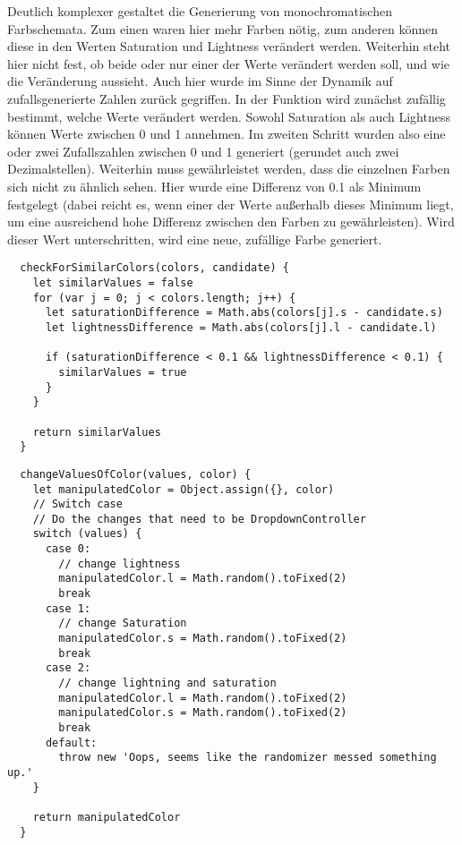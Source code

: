 Deutlich komplexer gestaltet die Generierung von monochromatischen Farbschemata. Zum einen waren hier mehr Farben nötig, zum anderen können diese in den Werten Saturation und Lightness verändert werden. Weiterhin steht hier nicht fest, ob beide oder nur einer der Werte verändert werden soll, und wie die Veränderung aussieht. Auch hier wurde im Sinne der Dynamik auf zufallsgenerierte Zahlen zurück gegriffen.
In der Funktion wird zunächst zufällig bestimmt, welche Werte verändert werden. Sowohl Saturation als auch Lightness können Werte zwischen 0 und 1 annehmen. Im zweiten Schritt wurden also eine oder zwei Zufallszahlen zwischen 0 und 1 generiert (gerundet auch zwei Dezimalstellen).
Weiterhin muss gewährleistet werden, dass die einzelnen Farben sich nicht zu ähnlich sehen. Hier wurde eine Differenz von 0.1 als Minimum festgelegt (dabei reicht es, wenn einer der Werte außerhalb dieses Minimum liegt, um eine ausreichend hohe Differenz zwischen den Farben zu gewährleisten). Wird dieser Wert unterschritten, wird eine neue, zufällige Farbe generiert.

\begin{lstlisting}
  checkForSimilarColors(colors, candidate) {
    let similarValues = false
    for (var j = 0; j < colors.length; j++) {
      let saturationDifference = Math.abs(colors[j].s - candidate.s)
      let lightnessDifference = Math.abs(colors[j].l - candidate.l)

      if (saturationDifference < 0.1 && lightnessDifference < 0.1) {
        similarValues = true
      }
    }

    return similarValues
  }
\end{lstlisting}

\begin{lstlisting}
  changeValuesOfColor(values, color) {
    let manipulatedColor = Object.assign({}, color)
    // Switch case
    // Do the changes that need to be DropdownController
    switch (values) {
      case 0:
        // change lightness
        manipulatedColor.l = Math.random().toFixed(2)
        break
      case 1:
        // change Saturation
        manipulatedColor.s = Math.random().toFixed(2)
        break
      case 2:
        // change lightning and saturation
        manipulatedColor.l = Math.random().toFixed(2)
        manipulatedColor.s = Math.random().toFixed(2)
        break
      default:
        throw new 'Oops, seems like the randomizer messed something up.'
    }

    return manipulatedColor
  }
\end{lstlisting}

